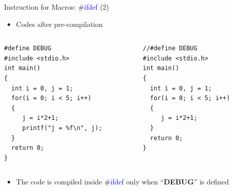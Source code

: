 \begin{frame}[fragile]{Instruction for Macros: \#\textcolor{blue}{ifdef} (2)}
\begin{itemize}
	\item {Codes after pre-compilation}
\end{itemize}
\vspace{-0.1in}
\begin{columns}
\begin{column}{0.52\linewidth}
\begin{lstlisting}[xleftmargin=0.02\linewidth, linewidth=0.9\linewidth]
#define DEBUG
#include <stdio.h>
int main()
{
  int i = 0, j = 1;
  for(i = 0; i < 5; i++)
  {
     j = i*2+1;
     printf("j = %f\n", j);
  }
  return 0;
}
\end{lstlisting}
\end{column}
\begin{column}{0.47\linewidth}
\begin{lstlisting}
//#define DEBUG
#include <stdio.h>
int main()
{
  int i = 0, j = 1;
  for(i = 0; i < 5; i++)
  {
     j = i*2+1;
  }
  return 0;
}
\end{lstlisting}
\end{column}
\end{columns}
\vspace{-0.2in}
\begin{itemize}
	\item {The code is compiled inside \#\textcolor{blue}{ifdef} only when ``\textbf{DEBUG}'' is defined}
\end{itemize}
\end{frame}